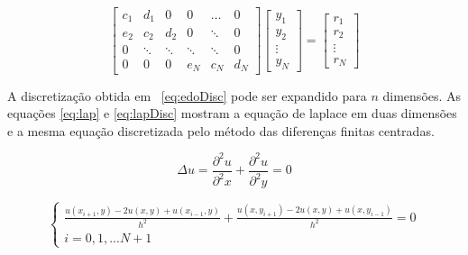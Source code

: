 \begin{equation}
\begin{bmatrix}
    c_1 & d_1 	& 0 	& 0  & \dots 	& 0 \\
    e_2 & c_2 	& d_2 	& 0  & \ddots 	& 0 \\
    0 	& \ddots 	& \ddots 	& \ddots  	 & \ddots 	& 0 \\
    0 	& 0 	& 0 	& e_N  	 & c_N 	& d_N 
\end{bmatrix}
\begin{bmatrix}
    y_1\\ y_2\\ \vdots \\y_N
\end{bmatrix}
=
\begin{bmatrix}
    r_1\\ r_2\\ \vdots \\r_N
\end{bmatrix}
\end{equation}

A discretização obtida em  ~\ref{eq:edoDisc} pode ser expandido para $n$ dimensões. As equações \ref{eq:lap} e \ref{eq:lapDisc} mostram a equação de laplace em duas dimensões e a mesma equação discretizada pelo método das diferenças finitas centradas.

\begin{equation}
    \label{eq:lap}
    \Delta u = \frac{\partial^2 u}{\partial^2 x} + \frac{\partial^2 u}{\partial^2 y} = 0
\end{equation}

\begin{equation}
	\label{eq:lapDisc}
	\begin{cases}
		 \frac{u(x_{i+1}, y) - 2u(x, y) +u(x_{i-1}, y)}{h^2} +
		 \frac{u(x, y_{i+1}) - 2u(x, y) +u(x, y_{i-1} )}{h^2} = 0 \\
			 i = 0, 1, ... N+1
	\end{cases}
\end{equation}
